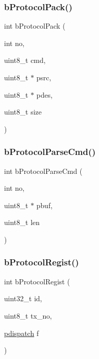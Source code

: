 \subsubsection{\texorpdfstring{b\+Protocol\+Pack()}{bProtocolPack()}}
{\footnotesize\ttfamily int b\+Protocol\+Pack (\begin{DoxyParamCaption}\item[{int}]{no,  }\item[{uint8\+\_\+t}]{cmd,  }\item[{uint8\+\_\+t $\ast$}]{psrc,  }\item[{uint8\+\_\+t $\ast$}]{pdes,  }\item[{uint8\+\_\+t}]{size }\end{DoxyParamCaption})}

\mbox{\label{group___p_r_o_t_o_c_o_l___exported___functions_ga201cb6ee4bc47d6551d221c631490300}} 
\subsubsection{\texorpdfstring{b\+Protocol\+Parse\+Cmd()}{bProtocolParseCmd()}}
{\footnotesize\ttfamily int b\+Protocol\+Parse\+Cmd (\begin{DoxyParamCaption}\item[{int}]{no,  }\item[{uint8\+\_\+t $\ast$}]{pbuf,  }\item[{uint8\+\_\+t}]{len }\end{DoxyParamCaption})}

\mbox{\label{group___p_r_o_t_o_c_o_l___exported___functions_ga042c82b5764c60b4078866635c8e8c7b}} 
\subsubsection{\texorpdfstring{b\+Protocol\+Regist()}{bProtocolRegist()}}
{\footnotesize\ttfamily int b\+Protocol\+Regist (\begin{DoxyParamCaption}\item[{uint32\+\_\+t}]{id,  }\item[{uint8\+\_\+t}]{tx\+\_\+no,  }\item[{\mbox{\hyperlink{group___p_r_o_t_o_c_o_l___exported___types_definitions_ga385520b45d23dc3a4dde23de92b85c75}{pdispatch}}}]{f }\end{DoxyParamCaption})}

